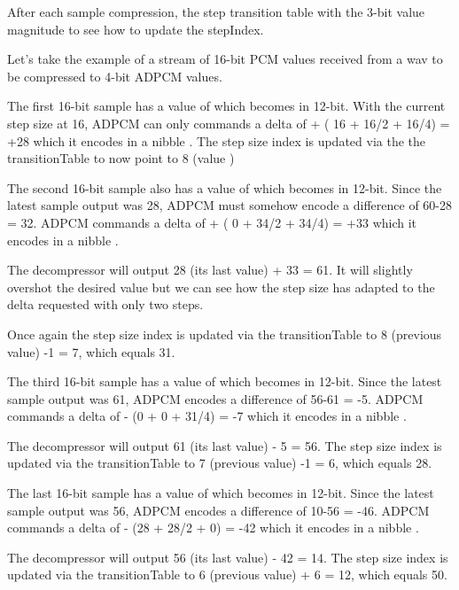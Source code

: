 After each sample compression, the step transition table with the 3-bit value magnitude to see how to update the stepIndex.

 

Let's take the example of a stream of 16-bit PCM values received from a wav to be compressed to 4-bit ADPCM values.



The first 16-bit sample has a value of  which becomes  in 12-bit. With the current step size at 16, ADPCM can only commands a delta of + ( 16 + 16/2 + 16/4) = +28 which it encodes in a nibble . The step size index is updated via the the transitionTable to now point to 8 (value )

The second 16-bit sample also has a value of  which becomes  in 12-bit. Since the latest sample output was 28, ADPCM must somehow encode a difference of 60-28 = 32. ADPCM commands a delta of + ( 0 + 34/2 + 34/4) = +33 which it encodes in a nibble . 

The decompressor will output 28 (its last value) + 33 = 61. It will slightly overshot the desired value but we can see how the step size has adapted to the delta requested with only two steps. 

Once again the step size index is updated via the transitionTable to 8 (previous value) -1 = 7, which equals 31.

The third 16-bit sample has a value of  which becomes  in 12-bit. Since the latest sample output was 61, ADPCM encodes a difference of 56-61 = -5. ADPCM commands a delta of - (0 + 0 + 31/4) = -7 which it encodes in a nibble . 

The decompressor will output 61 (its last value) - 5 = 56. The step size index is updated via the transitionTable to 7 (previous value) -1 = 6, which equals 28.

The last 16-bit sample has a value of  which becomes  in 12-bit. Since the latest sample output was 56, ADPCM encodes a difference of 10-56 = -46. ADPCM commands a delta of - (28 + 28/2 + 0) = -42 which it encodes in a nibble . 

The decompressor will output 56 (its last value) - 42 = 14. The step size index is updated via the transitionTable to 6 (previous value) + 6 = 12, which equals 50.



